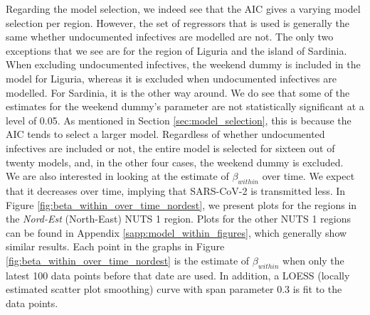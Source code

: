 \documentclass[12pt]{article}
\begin{document}
    Regarding the model selection, we indeed see that the AIC gives a varying model selection per region. However, the set of regressors that is used is generally the same whether undocumented infectives are modelled are not. The only two exceptions that we see are for the region of Liguria and the island of Sardinia. When excluding undocumented infectives, the weekend dummy is included in the model for Liguria, whereas it is excluded when undocumented infectives are modelled. For Sardinia, it is the other way around. We do see that some of the estimates for the weekend dummy's parameter are not statistically significant at a level of 0.05. As mentioned in Section \ref{sec:model_selection}, this is because the AIC tends to select a larger model. Regardless of whether undocumented infectives are included or not, the entire model is selected for sixteen out of twenty models, and, in the other four cases, the weekend dummy is excluded. \\
	
	We are also interested in looking at the estimate of $\beta_{within}$ over time. We expect that it decreases over time, implying that SARS-CoV-2 is transmitted less. In Figure \ref{fig:beta_within_over_time_nordest}, we present plots for the regions in the \textit{Nord-Est} (North-East) NUTS 1 region. Plots for the other NUTS 1 regions can be found in Appendix \ref{sapp:model_within_figures}, which generally show similar results. Each point in the graphs in Figure \ref{fig:beta_within_over_time_nordest} is the estimate of $\beta_{within}$ when only the latest 100 data points before that date are used. In addition, a LOESS (locally estimated scatter plot smoothing) curve with span parameter 0.3 is fit to the data points. \\
	
\end{document}
